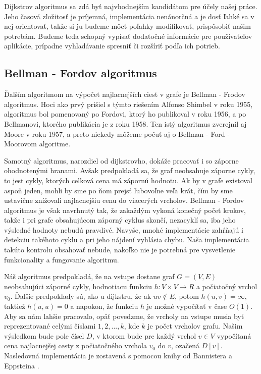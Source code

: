 Dijkstrov algoritmus sa zdá byť najvhodnejším kandidátom pre účely našej práce. Jeho časová zložitosť je príjemná, implementácia nenánorčná a je dosť ľahké sa v nej orientovať, takže si ju budeme môcť poľahky modifikovať, prispôsobiť našim potrebám. Budeme teda schopný vypísať dodatočné informácie pre používaťeľov aplikácie, prípadne vyhľadávanie spresniť či rozšíriť podľa ich potrieb.\newline


\subsection{Bellman - Fordov algoritmus}

Ďalším algoritmom na výpočet najlacnejších ciest v grafe je Bellman - Frodov algoritmus. Hoci ako prvý prišiel s týmto riešením Alfonso Shimbel v roku 1955, algoritmus bol pomenovaný po Fordovi, ktorý ho publikoval v roku 1956, a po Bellmanovi, ktorého publikácia je z roku 1958. Ten istý algoritmus zverejnil aj Moore v roku 1957, a preto niekedy môžeme počuť aj o Bellman - Ford - Moorovom algoritme.\newline

Samotný algoritmus, narozdiel od dijkstrovho, dokáže pracovať i so záporne ohodnotenými hranami. Avšak predpokladá sa, že graf neobsahuje záporne cykly, to jest cykly, ktorých celková cena má zápornú hodnotu. Ak by v grafe existoval aspoň jeden, mohli by sme po ňom prejsť ľubovoľne veľa krát, čím by sme ustavične znížovali najlacnejšiu cenu do viacerých vrcholov. Bellman - Fordov algoritmus je však navrhnutý tak, že zakaždým vykoná konečný počet krokov, takže i pri grafe obsahujúcom záporný cyklus skončí, nezacyklí sa, iba jeho výsledné hodnoty nebudú pravdivé. Navyše, mnohé implementácie zahŕňajú i detekciu takéhoto cyklu a pri jeho nájdení vyhlásia chybu. Naša implementácia takúto kontrolu obsahovať nebude, nakoľko nie je potrebná pre vysvetlenie funkcionality a fungovanie algoritmu.\newline

Náš algoritmus predpokladá, že na vstupe dostane graf $G = (V, E)$ neobsahujúci záporné cykly, hodnotiacu funkciu $h: V \times V \rightarrow R$ a počiatočný vrchol $v_{0}$. Ďalšie predpoklady sú, ako u dijkstru, že ak $uv \notin E$, potom $h(u,v) = \infty$, taktiež $h(u,u) = 0$ a napokon, že funkciu $h$ je možné vypočítať v čase $O(1)$. Aby sa nám lahšie pracovalo, opäť povedzme, že vrcholy na vstupe musia byť reprezentované celými číslami $1, 2, ..., k$, kde $k$ je počet vrcholov grafu. Našim výsledkom bude pole čísel $D$, v ktorom bude pre každý vrchol $v \in V$ vypočítaná cena najlacnejšej cesty z počiatočného vrchola $v_{0}$ do $v$, ozačená $D [v]$. Nasledovná implementácia je zostavená s pomocou knihy od Bannistera a Eppsteina \cite{bannister2012randomized}.\newline

